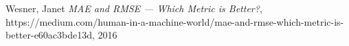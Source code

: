 \documentclass[
	letterpaper, %
]{jdf}
\begin{document}
\makeatletter
\renewcommand\@biblabel[1]{\textbullet}
\makeatother

\begin{thebibliography}{shortest-entry}

 Wesner, Janet \textit{MAE and RMSE — Which Metric is Better?}, https://medium.com/human-in-a-machine-world/mae-and-rmse-which-metric-is-better-e60ac3bde13d, 2016

\end{thebibliography}
\end{document}
